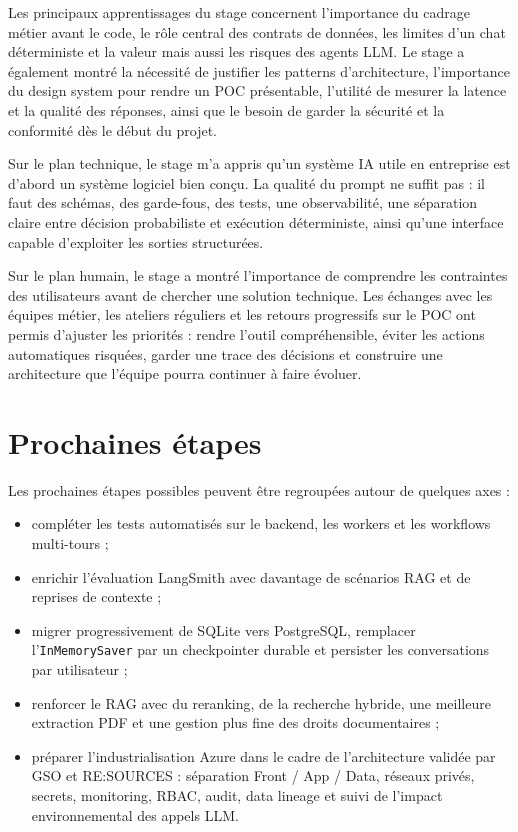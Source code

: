 \documentclass[a4paper,11pt,english,openany]{book}
\begin{document}
Les principaux apprentissages du stage concernent l'importance du cadrage métier avant le code, le rôle central des contrats de données, les limites d'un chat déterministe et la valeur mais aussi les risques des agents LLM. Le stage a également montré la nécessité de justifier les patterns d'architecture, l'importance du design system pour rendre un POC présentable, l'utilité de mesurer la latence et la qualité des réponses, ainsi que le besoin de garder la sécurité et la conformité dès le début du projet.

Sur le plan technique, le stage m'a appris qu'un système IA utile en entreprise est d'abord un système logiciel bien conçu. La qualité du prompt ne suffit pas : il faut des schémas, des garde-fous, des tests, une observabilité, une séparation claire entre décision probabiliste et exécution déterministe, ainsi qu'une interface capable d'exploiter les sorties structurées.

Sur le plan humain, le stage a montré l'importance de comprendre les contraintes des utilisateurs avant de chercher une solution technique. Les échanges avec les équipes métier, les ateliers réguliers et les retours progressifs sur le POC ont permis d'ajuster les priorités : rendre l'outil compréhensible, éviter les actions automatiques risquées, garder une trace des décisions et construire une architecture que l'équipe pourra continuer à faire évoluer.

\section{Prochaines étapes}

Les prochaines étapes possibles peuvent être regroupées autour de quelques axes :
\begin{itemize}
    \item compléter les tests automatisés sur le backend, les workers et les workflows multi-tours ;
    \item enrichir l'évaluation LangSmith avec davantage de scénarios RAG et de reprises de contexte ;
    \item migrer progressivement de SQLite vers PostgreSQL, remplacer l'\texttt{InMemorySaver} par un checkpointer durable et persister les conversations par utilisateur ;
    \item renforcer le RAG avec du reranking, de la recherche hybride, une meilleure extraction PDF et une gestion plus fine des droits documentaires ;
    \item préparer l'industrialisation Azure dans le cadre de l'architecture validée par GSO et RE:SOURCES : séparation Front / App / Data, réseaux privés, secrets, monitoring, RBAC, audit, data lineage et suivi de l'impact environnemental des appels LLM.
\end{itemize}
\end{document}
